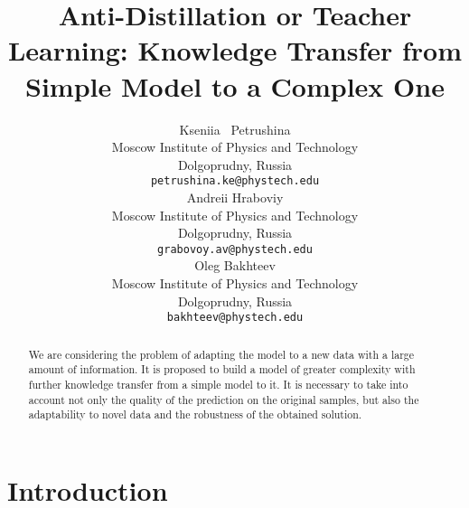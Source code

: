 \documentclass{article}
\title{Anti-Distillation or Teacher Learning: Knowledge Transfer from Simple Model to a Complex One}
\author{ Kseniia ~Petrushina \\
	Moscow Institute of Physics and Technology\\
	Dolgoprudny, Russia \\
	\texttt{petrushina.ke@phystech.edu} \\
	\And
	Andreii Hraboviy \\
	Moscow Institute of Physics and Technology\\
	Dolgoprudny, Russia \\
	\texttt{grabovoy.av@phystech.edu} \\
	\And
	Oleg Bakhteev \\
	Moscow Institute of Physics and Technology\\
	Dolgoprudny, Russia \\
	\texttt{bakhteev@phystech.edu}
}
\date{}
\begin{document}
\maketitle

\begin{abstract}
	We are considering the problem of adapting the model to a new data with a large amount of information. It is proposed to build a model of greater complexity with further knowledge transfer from a simple model to it. It is necessary to take into account not only the quality of the prediction on the original samples, but also the adaptability to novel data and the robustness of the obtained solution.
\end{abstract}



\section{Introduction}




\end{document}
